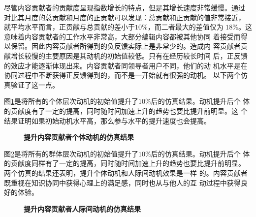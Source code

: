 尽管内容贡献者的贡献度呈现指数增长的特点，但是其增长速度非常缓慢。通过
对比其月度的总贡献和月度的正贡献可以发现：总贡献和正贡献的值非常接近，
就平均水平而言，正贡献与总贡献的差小于$10\%$，而二者最大的差值仅为
$18\%$。这意味着内容贡献者的工作水平非常高，大部分编辑内容都被其他协同
着接受而得以保留。因此内容贡献者所得到的负反馈实际上是非常少的。造成内
容贡献者贡献增长较慢的主要原因是其动机的初始值较低。只有在经历较长时间
后，正反馈的效应才能逐渐体现出来。内容贡献者同领导者用户不同，他们的动
机水平是在协同过程中不断获得正反馈得到的，而不是一开始就有很强的动机。
以下两个仿真验证了这一点。

图\ref{fig:improve5}是将所有的个体层次动机的初始值提升了$10\%$后的仿真结果。动机提升后个
体的贡献度有了一定的提高，同时随时间加速上升的趋势也要比提升前明显。这
个结果证明如果初始动机水平高，那么参与水平的提升速度也会提高。

\begin{figure}[!htb]
  \centering
  \caption{\small{\textbf{提升内容贡献者个体动机的仿真结果}}}
  \label{fig:improve5}
\end{figure}

图\ref{fig:improve6}是将所有的群体层次动机的初始值提升了$10\%$后的仿真结果。动机提升后个
体的贡献度同样有了一定的提高，同时随时间加速上升的趋势也要比提升前明显。
两个仿真的结果还表明，提升个体动机和人际间动机效果是一样
的。内容贡献者既重视在知识协同中获得心理上的满足感，同时也从与他人的互
动过程中获得良好的体验。

\begin{figure}[!htb]
  \centering
  \caption{\small{\textbf{提升内容贡献者人际间动机的仿真结果}}}
  \label{fig:improve6}
\end{figure}

